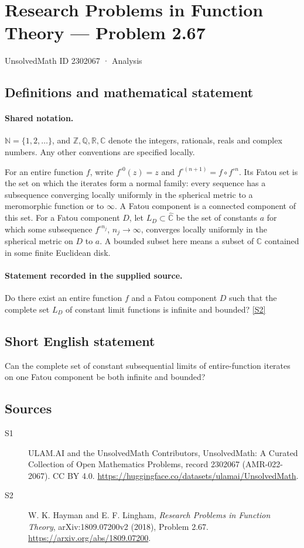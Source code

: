 \documentclass[11pt]{article}
\newcommand{\sref}[2]{\hyperlink{source:#1:#2}{[S#2]}}
\begin{document}
\setcounter{section}{2302066}
\section{Research Problems in Function Theory — Problem 2.67}\label{2302067}
{\small\sffamily UnsolvedMath ID 2302067 · Analysis}
\subsection{Definitions and mathematical statement}

\paragraph{Shared notation.}$\mathbb N=\{1,2,\ldots\}$, and $\mathbb Z,\mathbb Q,\mathbb R,\mathbb C$ denote the integers, rationals, reals and complex numbers. Any other conventions are specified locally.


For an entire function $f$, write $f^{\circ0}(z)=z$ and $f^{\circ(n+1)}=f\circ f^{\circ n}$. Its Fatou set is the set on which the iterates form a normal family: every sequence has a subsequence converging locally uniformly in the spherical metric to a meromorphic function or to $\infty$. A Fatou component is a connected component of this set. For a Fatou component $D$, let $L_D\subset\widehat{\mathbb C}$ be the set of constants $a$ for which some subsequence $f^{\circ n_j}$, $n_j\to\infty$, converges locally uniformly in the spherical metric on $D$ to $a$. A bounded subset here means a subset of $\mathbb C$ contained in some finite Euclidean disk.
\paragraph{Statement recorded in the supplied source.}
Do there exist an entire function $f$ and a Fatou component $D$ such that the complete set $L_D$ of constant limit functions is infinite and bounded? \sref{2302067}{2}
\subsection{Short English statement}
Can the complete set of constant subsequential limits of entire-function iterates on one Fatou component be both infinite and bounded?
\subsection{Sources}
\begin{description}
\item[\hypertarget{source:2302067:1}{S1}] ULAM.AI and the UnsolvedMath Contributors, UnsolvedMath: A Curated Collection of Open Mathematics Problems, record 2302067 (AMR-022-2067). CC BY 4.0. \url{https://huggingface.co/datasets/ulamai/UnsolvedMath}.
\item[\hypertarget{source:2302067:2}{S2}] W. K. Hayman and E. F. Lingham, \emph{Research Problems in Function Theory}, arXiv:1809.07200v2 (2018), Problem 2.67. \url{https://arxiv.org/abs/1809.07200}.
\end{description}
\label{end:2302067}
\end{document}
